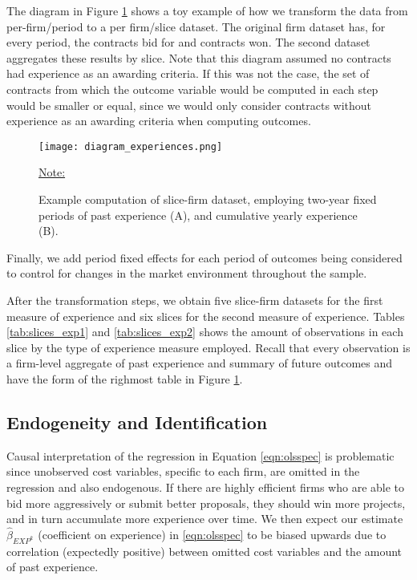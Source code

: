 The diagram in Figure \ref{fig:diagram_experience} shows a toy example of how we transform the data from per-firm/period to a per firm/slice dataset. The original firm dataset has, for every period, the contracts bid for and contracts won. The second dataset aggregates these results by slice. Note that this diagram assumed no contracts had experience as an awarding criteria. If this was not the case, the set of contracts from which the outcome variable would be computed in each step would be smaller or equal, since we would only consider contracts without experience as an awarding criteria when computing outcomes.

\begin{figure}
  \texttt{[image: diagram\_experiences.png]}
  \caption{Example computation of slice-firm dataset, employing two-year fixed periods of past experience (A), and cumulative yearly experience (B).}
  \label{fig:diagram_experience}
  \vskip 0.5mm
  { \footnotesize \underline{Note:} }
\end{figure}

Finally, we add period fixed effects for each period of outcomes being considered to control for changes in the market environment throughout the sample.


After the transformation steps, we obtain five slice-firm datasets for the first measure of experience and six slices for the second measure of experience. Tables \ref{tab:slices_exp1} and \ref{tab:slices_exp2} shows the amount of observations in each slice by the type of experience measure employed. Recall that every observation is a firm-level aggregate of past experience and summary of future outcomes and have the form of the righmost table in Figure \ref{fig:diagram_experience}.








\subsection{Endogeneity and Identification}
Causal interpretation of the regression in Equation \ref{eqn:olsspec} is problematic since unobserved cost variables, specific to each firm, are omitted in the regression and also endogenous. If there are highly efficient firms who are able to bid more aggressively or submit better proposals, they should win more projects, and in turn accumulate more experience over time. We then expect our estimate $\hat{\beta}_{EXP^k}$ (coefficient on experience) in \ref{eqn:olsspec} to be biased upwards due to correlation (expectedly positive) between omitted cost variables and the amount of past experience.


